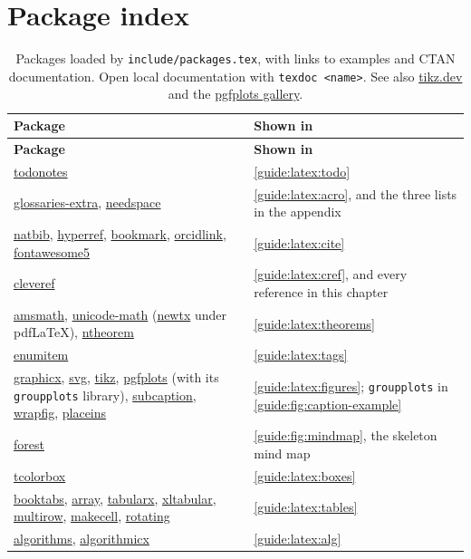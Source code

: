 \section{Package index}\label{guide:latex:index}
\newcommand{\ctan}[1]{\href{https://ctan.org/pkg/#1}{#1}}
\begin{xltabular}{\linewidth}{>{\ttfamily\raggedright\arraybackslash{}\hsize}X >{\raggedright\arraybackslash{}\hsize}X}
  \caption{Packages loaded by \texttt{include/packages.tex}, with links to examples and CTAN documentation. Open local documentation with \texttt{texdoc <name>}. See also \href{https://tikz.dev/}{tikz.dev} and the \href{https://pgfplots.sourceforge.net/}{pgfplots gallery}.}\label{guide:tab:package-index}\\
  \toprule
  \normalfont\textbf{Package} & \textbf{Shown in} \\
  \midrule
  \endfirsthead
  \toprule
  \normalfont\textbf{Package} & \textbf{Shown in} \\
  \midrule
  \endhead
  \ctan{todonotes} & \cref{guide:latex:todo} \\
  \ctan{glossaries-extra}, \ctan{needspace} & \cref{guide:latex:acro}, and the three lists in the appendix \\
  \ctan{natbib}, \ctan{hyperref}, \ctan{bookmark}, \ctan{orcidlink}, \ctan{fontawesome5} & \cref{guide:latex:cite} \\
  \ctan{cleveref} & \cref{guide:latex:cref}, and every reference in this chapter \\
  \ctan{amsmath}, \ctan{unicode-math} (\ctan{newtx} under pdfLaTeX), \ctan{ntheorem} & \cref{guide:latex:theorems} \\
  \ctan{enumitem} & \cref{guide:latex:tags} \\
  \ctan{graphicx}, \ctan{svg}, \ctan{tikz}, \ctan{pgfplots} (with its \texttt{groupplots} library), \ctan{subcaption}, \ctan{wrapfig}, \ctan{placeins} & \cref{guide:latex:figures}; \texttt{groupplots} in \cref{guide:fig:caption-example} \\
  \ctan{forest} & \cref{guide:fig:mindmap}, the skeleton mind map \\
  \ctan{tcolorbox} & \cref{guide:latex:boxes} \\
  \ctan{booktabs}, \ctan{array}, \ctan{tabularx}, \ctan{xltabular}, \ctan{multirow}, \ctan{makecell}, \ctan{rotating} & \cref{guide:latex:tables} \\
  \ctan{algorithms}, \ctan{algorithmicx} & \cref{guide:latex:alg} \\

\end{xltabular}
